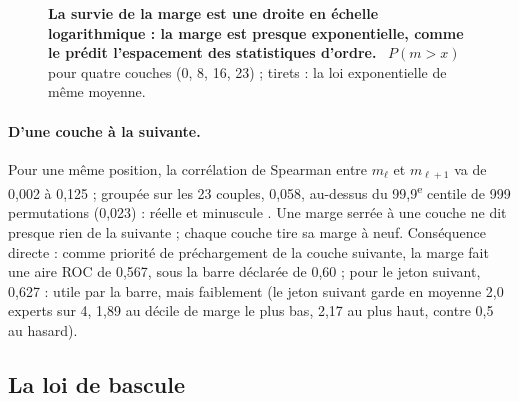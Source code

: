 \begin{figure}[tbp]
\centering
\GrapheTropicaleSurvie
\caption[La loi de la marge]{\textbf{La survie de la marge est une droite en échelle logarithmique : la marge est presque exponentielle, comme le prédit l'espacement des statistiques d'ordre.} \mes~$P(m > x)$ pour quatre couches (0, 8, 16, 23) ; tirets : la loi exponentielle de même moyenne. }
\label{fig:t3-trop-survie}
\end{figure}

\paragraph{D'une couche à la suivante.} Pour une même position, la corrélation de Spearman entre $m_\ell$ et $m_{\ell+1}$ va de 0,002 à 0,125 ; groupée sur les 23 couples, 0,058, au-dessus du 99,9\textsuperscript{e} centile de 999 permutations (0,023) : réelle et minuscule \mes. Une marge serrée à une couche ne dit presque rien de la suivante ; chaque couche tire sa marge à neuf. Conséquence directe : comme priorité de préchargement de la couche suivante, la marge fait une aire ROC de 0,567, sous la barre déclarée de 0,60 ; pour le jeton suivant, 0,627 : utile par la barre, mais faiblement (le jeton suivant garde en moyenne 2,0 experts sur 4, 1,89 au décile de marge le plus bas, 2,17 au plus haut, contre 0,5 au hasard).

\subsection{La loi de bascule}\label{t3tro:sec:loi-bascule}

